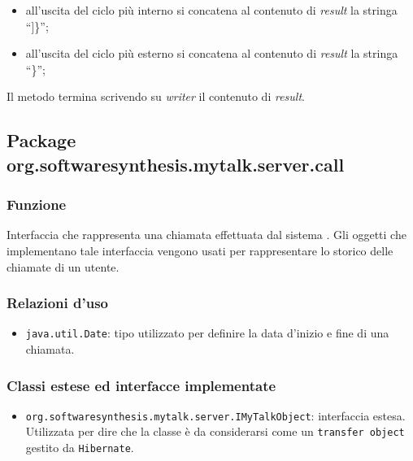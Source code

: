 \begin{description}
\begin{itemize}
\begin{itemize}
\begin{itemize}
				\item all'uscita del ciclo  più interno si concatena al contenuto di \textit{result} la stringa ``]\}'';
				\item all'uscita del ciclo  più esterno si concatena al contenuto di \textit{result} la stringa ``\}'';
			\end{itemize}
		\end{itemize}
	\end{itemize}
	Il metodo termina scrivendo su \textit{writer} il contenuto di \textit{result}.	
	
\end{description}

\subsection{Package org.softwaresynthesis.mytalk.server.call}\label{sec:call}


\subsubsection*{Funzione}
Interfaccia che rappresenta una chiamata effettuata dal sistema \caName. Gli oggetti che implementano tale interfaccia vengono usati per rappresentare lo storico delle chiamate di un utente.

\subsubsection*{Relazioni d'uso}
\begin{itemize}
	\item \texttt{java.util.Date}: tipo utilizzato per definire la data d'inizio e fine di una chiamata.
\end{itemize}

\subsubsection*{Classi estese ed interfacce implementate}

\begin{itemize}
	\item \texttt{org.softwaresynthesis.mytalk.server.IMyTalkObject}: interfaccia estesa. Utilizzata per dire che la classe è da considerarsi come un \texttt{transfer object} gestito da \texttt{Hibernate}.
\end{itemize}

